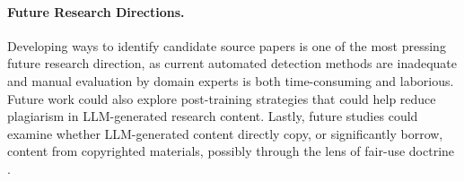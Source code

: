 \paragraph{Future Research Directions.} 
Developing ways 
to identify 
candidate source papers 
is one of the most pressing future research direction, 
as current automated detection methods are inadequate 
and manual evaluation by domain experts is both time-consuming and laborious.
Future work could also explore post-training strategies that could help reduce plagiarism in LLM-generated research content.
Lastly, 
future studies could examine 
whether LLM-generated 
content 
directly copy, or significantly borrow,
content from copyrighted materials, possibly through the lens of fair-use doctrine \citep{patterson1992understanding, balaji2024fair}.
